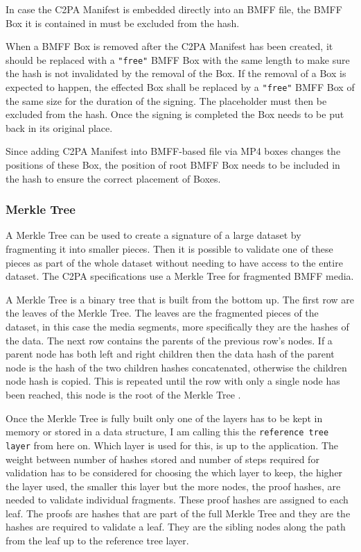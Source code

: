 In case the C2PA Manifest is embedded directly into an BMFF file, the BMFF Box it is contained in must be excluded from the hash.

When a BMFF Box is removed after the C2PA Manifest has been created, it should be replaced with a \texttt{"free"} BMFF Box with the same length to make sure the hash is not invalidated by the removal of the Box. If the removal of a Box is expected to happen, the effected Box shall be replaced by a \texttt{"free"} BMFF Box of the same size for the duration of the signing. The placeholder must then be excluded from the hash. Once the signing is completed the Box needs to be put back in its original place.

Since adding C2PA Manifest into BMFF-based file via MP4 boxes changes the positions of these Box, the position of root BMFF Box needs to be included in the hash to ensure the correct placement of Boxes.

\subsubsection{Merkle Tree\label{sec:merkle}}

A Merkle Tree can be used to create a signature of a large dataset by fragmenting it into smaller pieces. Then it is possible to validate one of these pieces as part of the whole dataset without needing to have access to the entire dataset. The C2PA specifications use a Merkle Tree for fragmented BMFF media.

A Merkle Tree is a binary tree that is built from the bottom up. The first row are the leaves of the Merkle Tree. The leaves are the fragmented pieces of the dataset, in this case the media segments, more specifically they are the hashes of the data. The next row contains the parents of the previous row's nodes. If a parent node has both left and right children then the data hash of the parent node is the hash of the two children hashes concatenated, otherwise the children node hash is copied. This is repeated until the row with only a single node has been reached, this node is the root of the Merkle Tree \cite{merkle}.

Once the Merkle Tree is fully built only one of the layers has to be kept in memory or stored in a data structure, I am calling this the \texttt{reference tree layer} from here on. Which layer is used for this, is up to the application. The weight between number of hashes stored and number of steps required for validation has to be considered for choosing the which layer to keep, the higher the layer used, the smaller this layer but the more nodes, the proof hashes, are needed to validate individual fragments. These proof hashes are assigned to each leaf. The proofs are hashes that are part of the full Merkle Tree and they are the hashes are required to validate a leaf. They are the sibling nodes along the path from the leaf up to the reference tree layer.

